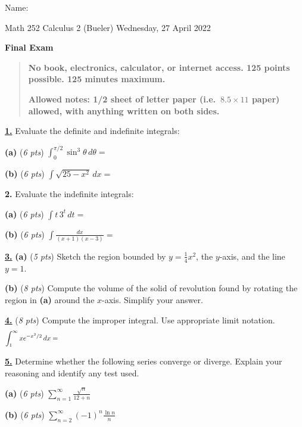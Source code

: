 \documentclass[11pt]{amsart}
\newcommand{\ds}{\displaystyle}
\newcommand{\prob}[1]{\bigskip\noindent\textbf{#1.} }
\newcommand{\cprob}[1]{\bigskip\noindent\underline{\textbf{#1.}} }
\newcommand{\pts}[1]{(\emph{#1 pts})}
\newcommand{\cprobpts}[2]{\cprob{#1} \pts{#2} \quad}
\newcommand{\ppartpts}[2]{\textbf{(#1)} \pts{#2} \quad}
\newcommand{\epartpts}[2]{\medskip\noindent \textbf{(#1)} \pts{#2} \quad}
\begin{document}
\hfill \Large Name:\underline{\phantom{Ed Bueler really really long long long name}}
\medskip

\scriptsize \noindent Math 252 Calculus 2 (Bueler) \hfill Wednesday, 27 April 2022
\medskip

\LARGE\centerline{\textbf{Final Exam}}

\smallskip
\begin{quote}
\large
\textbf{No book, electronics, calculator, or internet access.  125 points possible.  125 minutes maximum.}

\textbf{Allowed notes: 1/2 sheet of letter paper (i.e.~$8.5\times 11$ paper) allowed, with anything written on both sides.}
\end{quote}

\normalsize
\medskip

\thispagestyle{empty}

\cprob{1}  Evaluate the definite and indefinite integrals:

\epartpts{a}{6} $\ds  \int_0^{\pi/2} \sin^3 \theta\,d\theta =$
\vspace{2.5in}

\epartpts{b}{6} $\ds  \int \sqrt{25 - x^2}\,dx =$
\vfill


\clearpage\newpage
\prob{2}  Evaluate the indefinite integrals:

\epartpts{a}{6} $\ds  \int t\, 3^{t}\,dt =$
\vfill

\epartpts{b}{6} $\ds  \int \frac{dx}{(x+1)(x-3)} =$
\vfill


\clearpage\newpage
\cprob{3}  \ppartpts{a}{5} Sketch the region bounded by $\displaystyle y=\frac{1}{4} x^2$, the $y$-axis, and the line $y=1$.
\vfill

\epartpts{b}{8} Compute the volume of the solid of revolution found by rotating the region in \textbf{(a)} around the $x$-axis.  Simplify your answer.
\vfill


\clearpage\newpage
\cprobpts{4}{8}  Compute the improper integral.  Use appropriate limit notation.
    $$\int_1^\infty x e^{-x^2/2}\,dx = \hspace{5.0in}$$
\vfill

\cprob{5}  Determine whether the following series converge or diverge. Explain your reasoning and identify any test used.

\epartpts{a}{6}  $\ds \sum_{n = 1}^\infty \frac{\sqrt{n}}{12 + n}$
\vfill

\epartpts{b}{6}  $\ds \sum_{n = 2}^\infty (-1)^n\frac{\ln n}{n}$
\vspace{1.5in}
\end{document}
